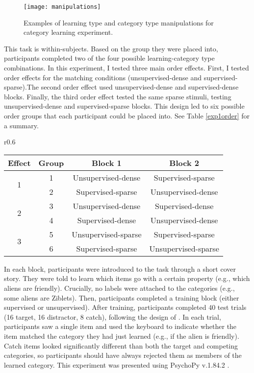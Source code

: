 \documentclass[../dissertation.tex]{subfiles}
\begin{document}
\begin{figure}[htp]
\texttt{[image: manipulations]}
\caption[Example stimuli for category learning task]{Examples of learning type and category type manipulations for category learning experiment.}
\vspace{-10pt}
\label{sloutskymanip}
\end{figure}
	This task is within-subjects. Based on the group they were placed into, participants completed two of the four possible learning-category type combinations. In this experiment, I tested three main order effects. First, I tested order effects for the matching conditions (unsupervised-dense and supervised-sparse).The second order effect used unsupervised-dense and supervised-dense blocks. Finally, the third order effect tested the same sparse stimuli, testing unsupervised-dense and supervised-sparse blocks. This design led to six possible order groups that each participant could be placed into. See Table \ref{exp1order} for a summary. 

\begin{wraptable}[11]{r}{0.6\linewidth}
\caption{Block orders for statistical density task}
\begin{center}
\begin{tabular}{ c|c|c|c } 
 \hline 
 Effect & Group & Block 1 & Block 2 \\ 
 \hline
 \multirow{2}{*}{1} & 1 & Unsupervised-dense & Supervised-sparse \\ 
 & 2 & Supervised-sparse & Unsupervised-dense \\ 
 \hline
  \multirow{2}{*}{2} & 3 & Unsupervised-dense & Supervised-dense \\ 
 & 4 & Supervised-dense & Unsupervised-dense \\
 \hline 
  \multirow{2}{*}{3} & 5 & Unsupervised-sparse & Supervised-sparse \\ 
 & 6 & Supervised-sparse & Unsupervised-sparse \\ 
 \hline
\end{tabular}
\end{center}
\vspace{-20pt}
\label{exp1order}
\end{wraptable} \par
 In each block, participants were introduced to the task through a short cover story. They were told to learn which items go with a certain property (e.g., which aliens are friendly). Crucially, no labels were attached to the categories (e.g., some aliens are Ziblets). Then, participants completed a training block (either supervised or unsupervised). After training, participants completed 40 test trials (16 target, 16 distractor, 8 catch), following the design of \citet{Kloos2008} . In each trial, participants saw a single item and used the keyboard to indicate whether the item matched the category they had just learned (e.g., if the alien is friendly). Catch items looked significantly different than both the target and competing categories, so participants should have always rejected them as members of the learned category. This experiment was presented using PsychoPy v.1.84.2 \citep{Peirce2007}. \par
\end{document}
